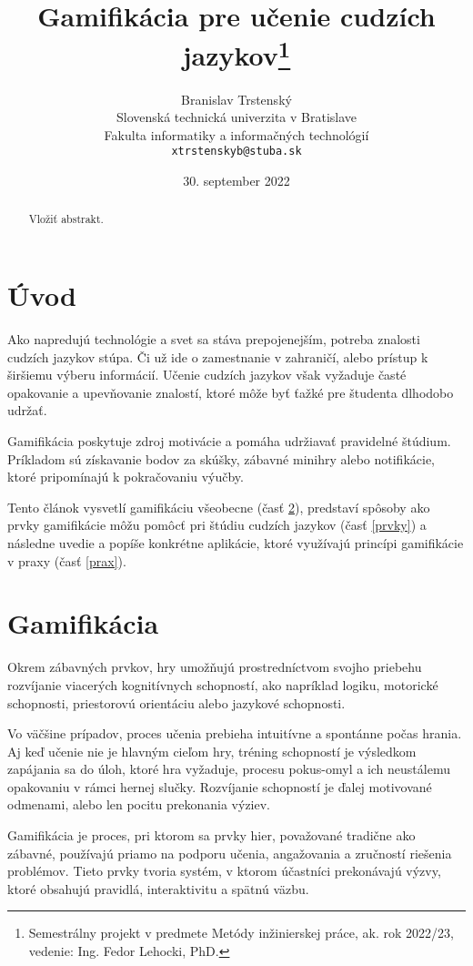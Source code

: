 \documentclass[10pt,twoside,slovak,a4paper]{article}
\title{Gamifikácia pre učenie cudzích jazykov\thanks{Semestrálny projekt v predmete Metódy inžinierskej práce, ak. rok 2022/23, vedenie: Ing. Fedor Lehocki, PhD.}} %
\author{Branislav Trstenský\\[2pt]
	{\small Slovenská technická univerzita v Bratislave}\\
	{\small Fakulta informatiky a informačných technológií}\\
	{\small \texttt{xtrstenskyb@stuba.sk}}
	}
\date{\small 30. september 2022} %
\begin{document}
\maketitle

\begin{abstract}

Vložiť abstrakt.

\end{abstract}


\section{Úvod}

Ako napredujú technológie a svet sa stáva prepojenejším, potreba znalosti cudzích jazykov stúpa. Či už ide o zamestnanie v zahraničí, alebo prístup k širšiemu výberu informácií. Učenie cudzích jazykov však vyžaduje časté opakovanie a upevňovanie znalostí, ktoré môže byť ťažké pre študenta dlhodobo udržať. 

Gamifikácia poskytuje zdroj motivácie a pomáha udržiavať pravidelné štúdium. Príkladom sú získavanie bodov za skúšky, zábavné minihry alebo notifikácie, ktoré pripomínajú k pokračovaniu výučby. 

Tento článok vysvetlí gamifikáciu všeobecne (časť \ref{gamifikacia}), predstaví spôsoby ako prvky gamifikácie môžu pomôcť pri štúdiu cudzích jazykov (časť \ref{prvky}) a následne uvedie a popíše konkrétne aplikácie, ktoré využívajú princípi gamifikácie v praxy (časť \ref{prax}).

\section{Gamifikácia} \label{gamifikacia}

Okrem zábavných prvkov, hry umožňujú prostredníctvom svojho priebehu rozvíjanie viacerých kognitívnych schopností, ako napríklad logiku, motorické schopnosti, priestorovú orientáciu alebo jazykové schopnosti. 

Vo väčšine prípadov, proces učenia prebieha intuitívne a spontánne počas hrania. Aj keď učenie nie je hlavným cieľom hry, tréning schopností je výsledkom zapájania sa do úloh, ktoré hra vyžaduje, procesu pokus-omyl a ich neustálemu opakovaniu v rámci hernej slučky. Rozvíjanie schopností je ďalej motivované odmenami, alebo len pocitu prekonania výziev. \cite{Rego}

Gamifikácia je proces, pri ktorom sa prvky hier, považované tradične ako zábavné, používajú priamo na podporu učenia, angažovania a zručností riešenia problémov. Tieto prvky tvoria systém, v ktorom účastníci prekonávajú výzvy, ktoré obsahujú pravidlá, interaktivitu a spätnú väzbu.
\end{document}
